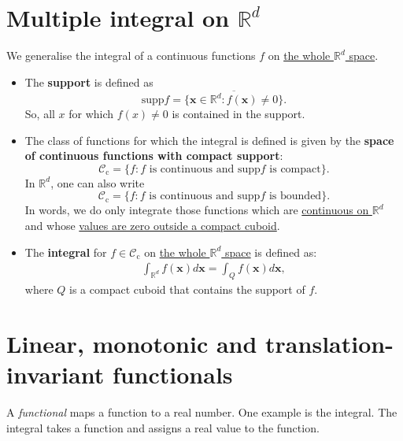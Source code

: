\documentclass[a4paper, 11pt]{article}
\theoremstyle{plain}
\theoremstyle{definition}
\begin{document}
\section{Multiple integral on $\mathbb R^d$}
We generalise the integral of a continuous functions $f$ on \underline{the whole $\mathbb R^d$ space}.
\begin{itemize}
	\item The \textbf{support} is defined as 
	\[
		\mathrm{supp} f = \overline{ \{ \mathbf x \in \mathbb R^d : f(\mathbf x) \neq 0 \}}.
	\]
	So, all $x$ for which $f(x) \neq 0$ is contained in the support.
	 
	\item The class of functions for which the integral is defined is given by the \textbf{space of continuous functions with compact support}:
	\[
		\mathcal C_{\mathrm c} = \{ f : f \text{ is continuous and } \mathrm{supp}f \text{ is compact} \}.
	\]
	In $\mathbb R^d$, one can also write 
	\[
		\mathcal C_{\mathrm c} = \{ f : f \text{ is continuous and } \mathrm{supp}f \text{ is bounded} \}.
	\]
	In words, we do only integrate those functions which are \underline{continuous on $\mathbb R^d$} and whose \underline{values are zero outside a compact cuboid}.
	
	\item The \textbf{integral} for $f \in \mathcal C_{\mathrm c}$ on \underline{the whole $\mathbb R^d$ space} is defined as:
	\begin{align}\label{integral}
		\int_{\mathbb R^d} f(\mathbf x) d\mathbf x = \int_Q f(\mathbf x)d \mathbf x,
	\end{align}
	where $Q$ is a compact cuboid that contains the support of $f$.
\end{itemize}

\section{Linear, monotonic and translation-invariant functionals} 
A \emph{functional} maps a function to a real number. One example is the integral. The integral takes a function and assigns a real value to the function. \\
\end{document}
